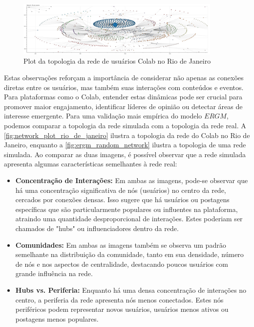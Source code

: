 \begin{figure}[!htb]
	\caption{Plot da topologia da rede de usuários Colab no Rio de Janeiro}
	\label{fig:network_plot_rio_de_janeiro}
	\centering
	\includegraphics[width=0.9\textwidth]{images/network_plot_rio_de_janeiro.png}
	\fautor
\end{figure}

Estas observações reforçam a importância de considerar não apenas as conexões diretas entre os usuários, mas também suas interações com conteúdos e eventos. Para plataformas como o Colab, entender estas dinâmicas pode ser crucial para promover maior engajamento, identificar líderes de opinião ou detectar áreas de interesse emergente. Para uma validação mais empírica do modelo $ERGM$, podemos comparar a topologia da rede simulada com a topologia da rede real. A \autoref{fig:network_plot_rio_de_janeiro} ilustra a topologia da rede do Colab no Rio de Janeiro, enquanto a \autoref{fig:ergm_random_network} ilustra a topologia de uma rede simulada. Ao comparar as duas imagens, é possível observar que a rede simulada apresenta algumas características semelhantes à rede real:

\begin{itemize}
	\item \textbf{Concentração de Interações:} Em ambas as imagens, pode-se observar que há uma concentração significativa de nós (usuários) no centro da rede, cercados por conexões densas. Isso sugere que há usuários ou postagens específicas que são particularmente populares ou influentes na plataforma, atraindo uma quantidade desproporcional de interações. Estes poderiam ser chamados de "hubs" ou influenciadores dentro da rede.
	\item \textbf{Comunidades:} Em ambas as imagens também se observa um padrão semelhante na distribuição da comunidade, tanto em sua densidade, número de nós e nos aspectos de centralidade, destacando poucos usuários com grande influência na rede.
	\item \textbf{Hubs vs. Periferia:} Enquanto há uma densa concentração de interações no centro, a periferia da rede apresenta nós menos conectados. Estes nós periféricos podem representar novos usuários, usuários menos ativos ou postagens menos populares.
\end{itemize}

